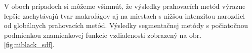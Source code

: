 \documentclass[a4paper,11pt,oneside]{article}%
\begin{document}
V oboch prípadoch si môžeme všimnúť, že výsledky prahovacích metód výrazne lepšie zachytávajú tvar makrofágov aj na miestach s nižšou intenzitou narozdiel od globálnych prahovacích metód. 
Výsledky segmentačnej metódy s počiatočnou podmienkou znamienkovej funkcie vzdialenosti zobrazený na obr. \ref{fig:niblack_sdf}.


\begin{figure}[H]  
    \hspace{5px}

\end{figure}
\end{document}
